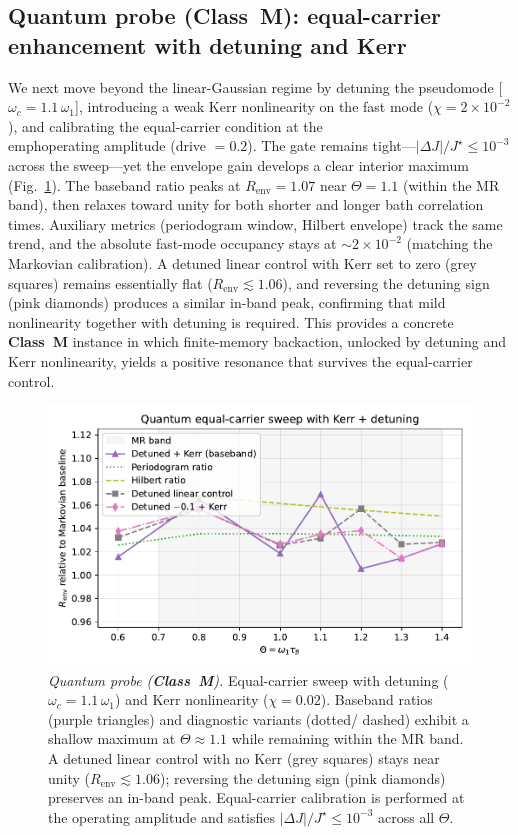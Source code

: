 \documentclass[11pt,letterpaper]{article}
\DeclareRobustCommand{\classM}{\textbf{Class~M}\xspace}
\begin{document}
\subsection{Quantum probe (\classM): equal-carrier enhancement with detuning and Kerr}
We next move beyond the linear-Gaussian regime by detuning the pseudomode [$\omega_c=1.1\,\omega_1$], introducing a weak Kerr nonlinearity on the fast mode ($\chi=2\times10^{-2}$), and calibrating the equal-carrier condition at the \\emph{operating amplitude} (drive $=0.2$). The gate remains tight---$|\Delta J|/J^\star\le 10^{-3}$ across the sweep---yet the envelope gain develops a clear interior maximum (Fig.~\ref{fig:quantum_positive}). The baseband ratio peaks at $R_{\mathrm{env}}=1.07$ near $\Theta=1.1$ (within the MR band), then relaxes toward unity for both shorter and longer bath correlation times. Auxiliary metrics (periodogram window, Hilbert envelope) track the same trend, and the absolute fast-mode occupancy stays at $\sim 2\times10^{-2}$ (matching the Markovian calibration). A detuned linear control with Kerr set to zero (grey squares) remains essentially flat ($R_{\mathrm{env}}\lesssim1.06$), and reversing the detuning sign (pink diamonds) produces a similar in-band peak, confirming that mild nonlinearity together with detuning is required. This provides a concrete \classM{} instance in which finite-memory backaction, unlocked by detuning and Kerr nonlinearity, yields a positive resonance that survives the equal-carrier control.

\begin{figure}[t]
\centering
\includegraphics[width=0.8\linewidth]{figF_quantum_nonlin.pdf}
\caption{\label{fig:quantum_positive}\emph{Quantum probe (\classM).} Equal-carrier sweep with detuning ($\omega_c=1.1\,\omega_1$) and Kerr nonlinearity ($\chi=0.02$). Baseband ratios (purple triangles) and diagnostic variants (dotted/ dashed) exhibit a shallow maximum at $\Theta\approx1.1$ while remaining within the MR band. A detuned linear control with no Kerr (grey squares) stays near unity ($R_{\mathrm{env}}\lesssim1.06$); reversing the detuning sign (pink diamonds) preserves an in-band peak. Equal-carrier calibration is performed at the operating amplitude and satisfies $|\Delta J|/J^\star\le10^{-3}$ across all $\Theta$.}
\end{figure}
\end{document}
